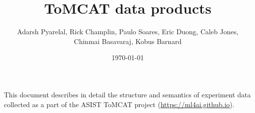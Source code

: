 \documentclass[11pt,letterpaper,oneside,openany,article]{memoir}
\title{ToMCAT data products}
\author{Adarsh Pyarelal, Rick Champlin, Paulo Soares, Eric Duong, Caleb
Jones, Chinmai Basavaraj, Kobus Barnard}
\date{\today}
\begin{document}
\maketitle
\setcounter{page}{2}

\tableofcontents*
\newpage

This document describes in detail the structure and semantics of experiment data
collected as a part of the ASIST ToMCAT project (\url{https://ml4ai.github.io}).








\end{document}
